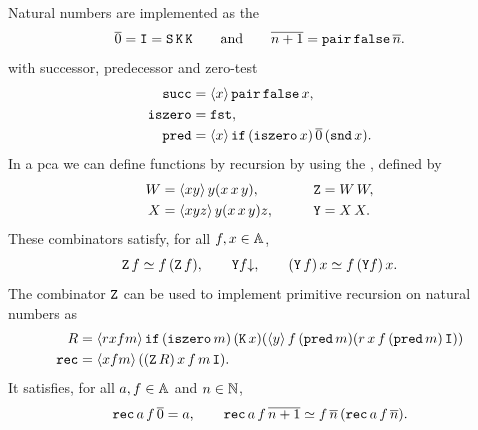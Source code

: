 %
Natural numbers are implemented as the
%
%
%
\label{sym:curry_numeral}%
%
%
\begin{equation}
  \label{eq:curry-numeral}%
  \numeral{0} = \combI = \combS\, \combK\, \combK
  \qquad\text{and}\qquad
  \numeral{n+1} = \combPair \, \combFalse \, \numeral{n}.
\end{equation}
%
with successor, predecessor and zero-test
%
%
%
%
%
\begin{align*}
  \pcacomb{succ} &= \pcalam{x}{\combPair \, \combFalse \,x},\\ 
  \pcacomb{iszero} &= \combFst,\\
  \pcacomb{pred} &=
  \pcalam{x}{\combIf\, (\pcacomb{iszero}\, x)\, \numeral{0}\, (\combSnd\, x)}.
\end{align*}
%
In a pca we can define functions by recursion by using the
%
%
%
%
%
\label{sym:combY}%
\label{sym:combZ}%
\label{sym:combW}%
%
, defined by
%
\begin{alignat*}{2}
  W &= \pcalam{x y}{y(x\, x\, y)}, &
  \qquad
  \combZ &= W\, W, \\
  X &= \pcalam{x y z}{y (x\, x\, y) z}, &
  \qquad
  \combY &= X\, X.
\end{alignat*}
%
These combinators satisfy, for all $f, x \in \AA$,
%
\begin{equation*}
  \combZ\, f \kleq f\, (\combZ\, f),
  \qquad
  \defined{\combY f},
  \qquad
  (\combY\, f)\, x \kleq f\, (\combY f)\, x.
\end{equation*}
%
The combinator $\combZ$ can be used to implement primitive recursion on natural numbers as
%
%
%
\begin{align*}
   R &= \pcalam{r x f m}{\combIf\, (\pcacomb{iszero}\, m)\, (\combK\, x)
        (\pcalam{y}{f\, (\pcacomb{pred}\, m)(r\, x\, f\, (\pcacomb{pred}\, m)\,
        \combI)})}
  \\
  \pcacomb{rec} &= \pcalam{x f m}{((\combZ\, R)\, x\, f\, m\, \combI)}.
\end{align*}
%
It satisfies, for all $a, f \in \AA$ and $n \in \NN$,
%
\begin{equation*}
  \pcacomb{rec}\, a\, f\, \numeral{0} = a,\qquad
  \pcacomb{rec}\, a\, f\, \numeral{n+1} \kleq
    f\, \numeral{n}\, (\pcacomb{rec}\, a\, f\, \numeral{n}).
\end{equation*}

